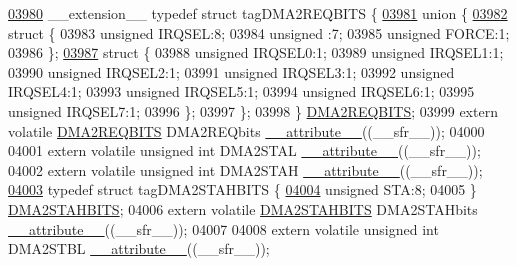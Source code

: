 \begin{DoxyCode}
\hypertarget{a00015_source_l03980}{}\hyperlink{a00014}{03980} \_\_extension\_\_ \textcolor{keyword}{typedef} \textcolor{keyword}{struct }tagDMA2REQBITS \{
\hypertarget{a00015_source_l03981}{}\hyperlink{a00015}{03981}   \textcolor{keyword}{union }\{
\hypertarget{a00015_source_l03982}{}\hyperlink{a00015}{03982}     \textcolor{keyword}{struct }\{
03983       \textcolor{keywordtype}{unsigned} IRQSEL:8;
03984       \textcolor{keywordtype}{unsigned} :7;
03985       \textcolor{keywordtype}{unsigned} FORCE:1;
03986     \};
\hypertarget{a00015_source_l03987}{}\hyperlink{a00015}{03987}     \textcolor{keyword}{struct }\{
03988       \textcolor{keywordtype}{unsigned} IRQSEL0:1;
03989       \textcolor{keywordtype}{unsigned} IRQSEL1:1;
03990       \textcolor{keywordtype}{unsigned} IRQSEL2:1;
03991       \textcolor{keywordtype}{unsigned} IRQSEL3:1;
03992       \textcolor{keywordtype}{unsigned} IRQSEL4:1;
03993       \textcolor{keywordtype}{unsigned} IRQSEL5:1;
03994       \textcolor{keywordtype}{unsigned} IRQSEL6:1;
03995       \textcolor{keywordtype}{unsigned} IRQSEL7:1;
03996     \};
03997   \};
03998 \} \hyperlink{a00014_de/df7/a00418}{DMA2REQBITS};
03999 \textcolor{keyword}{extern} \textcolor{keyword}{volatile} \hyperlink{a00014_de/df7/a00418}{DMA2REQBITS} DMA2REQbits \hyperlink{a00015_a493c46f03454991ccc5aa7a6e1dfb2a7}{\_\_attribute\_\_}((\_\_sfr\_\_));
04000 
04001 \textcolor{keyword}{extern} \textcolor{keyword}{volatile} \textcolor{keywordtype}{unsigned} \textcolor{keywordtype}{int}  DMA2STAL \hyperlink{a00015_a493c46f03454991ccc5aa7a6e1dfb2a7}{\_\_attribute\_\_}((\_\_sfr\_\_));
04002 \textcolor{keyword}{extern} \textcolor{keyword}{volatile} \textcolor{keywordtype}{unsigned} \textcolor{keywordtype}{int}  DMA2STAH \hyperlink{a00015_a493c46f03454991ccc5aa7a6e1dfb2a7}{\_\_attribute\_\_}((\_\_sfr\_\_));
\hypertarget{a00015_source_l04003}{}\hyperlink{a00014}{04003} \textcolor{keyword}{typedef} \textcolor{keyword}{struct }tagDMA2STAHBITS \{
\hypertarget{a00015_source_l04004}{}\hyperlink{a00014_a0eec78ddd2c12af678d5fab70fe62d14}{04004}   \textcolor{keywordtype}{unsigned} STA:8;
04005 \} \hyperlink{a00014_d2/de1/a00421}{DMA2STAHBITS};
04006 \textcolor{keyword}{extern} \textcolor{keyword}{volatile} \hyperlink{a00014_d2/de1/a00421}{DMA2STAHBITS} DMA2STAHbits \hyperlink{a00015_a493c46f03454991ccc5aa7a6e1dfb2a7}{\_\_attribute\_\_}((\_\_sfr\_\_));
04007 
04008 \textcolor{keyword}{extern} \textcolor{keyword}{volatile} \textcolor{keywordtype}{unsigned} \textcolor{keywordtype}{int}  DMA2STBL \hyperlink{a00015_a493c46f03454991ccc5aa7a6e1dfb2a7}{\_\_attribute\_\_}((\_\_sfr\_\_));

\end{DoxyCode}

